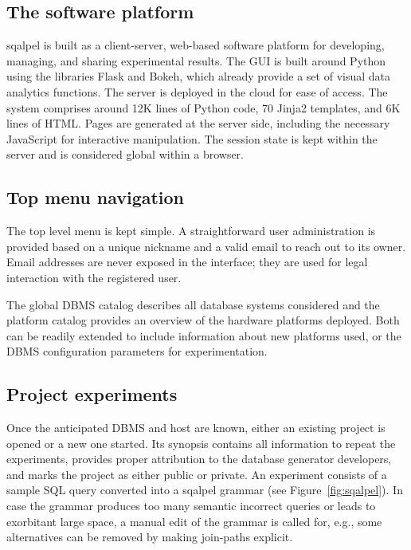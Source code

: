 \documentclass{cidr-2019}
\begin{document}
\subsection{The software platform}\label{GUI}
{\sc sqalpel}
 is built as a client-server, web-based software platform
for developing, managing, and sharing experimental results. The GUI is
built around Python using the libraries Flask and Bokeh, which already
provide a set of visual data analytics functions. The server is
deployed in the cloud for ease of access. The system comprises around
12K lines of Python code, 70 Jinja2 templates, and 6K lines of HTML.
Pages are generated at the server side, including the necessary
JavaScript for interactive manipulation.
The session state is kept within the server and is considered global
within a browser.

\pagebreak

\subsection{Top menu navigation}
The top level menu is kept simple. A straightforward user
administration is provided based on a unique nickname and a valid
email to reach out to its owner. Email addresses are never exposed in the interface; they
are used for legal interaction with the registered user.


The global DBMS catalog describes all database systems considered and
the platform catalog provides an overview of the hardware platforms
deployed. Both can be readily extended to include information about
new platforms used, or the DBMS configuration parameters for
experimentation.

\subsection{Project experiments}
Once the anticipated DBMS and host are known, either an existing
project is opened or a new one started. Its synopsis contains all
information to repeat the experiments, provides proper attribution to
the database generator developers, and marks the project as either
public or private. An experiment consists of a sample SQL query
converted into a {\sc sqalpel} grammar (see Figure~\ref{fig:sqalpel}). In
case the grammar produces too many semantic incorrect queries or leads
to exorbitant large space, a manual edit of the grammar is called
for, e.g., some alternatives can be removed by making join-paths
explicit.
\end{document}
